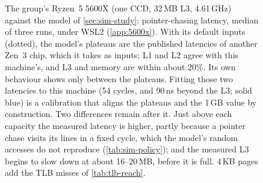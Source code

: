 \begin{figure}[htbp]
\caption[The group's Ryzen~5 5600X against the simulation]{The group's Ryzen~5 5600X (one CCD, 32\,MB L3, 4.61\,GHz) against the model of \cref{sec:sim-study}: pointer-chasing latency, median of three runs, under WSL2 (\cref{app:5600x}). With its default inputs (dotted), the model's plateaus are the published latencies of another Zen~3 chip, which it takes as inputs; L1 and L2 agree with this machine's, and L3 and memory are within about 20\%. Its own behaviour shows only between the plateaus. Fitting those two latencies to this machine (54 cycles, and 90\,ns beyond the L3; solid blue) is a calibration that aligns the plateaus and the 1\,GB value by construction. Two differences remain after it. Just above each capacity the measured latency is higher, partly because a pointer chase visits its lines in a fixed cycle, which the model's random accesses do not reproduce (\cref{tab:sim-policy}); and the measured L3 begins to slow down at about 16--20\,MB, before it is full. 4\,KB pages add the TLB misses of \cref{tab:tlb-reach}.}
\label{fig:m5600x-latency}
\end{figure}

